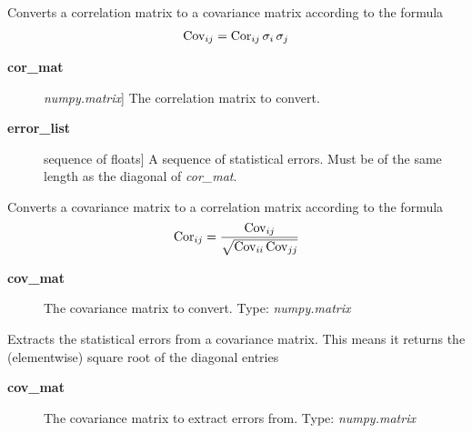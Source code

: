 \documentclass[letterpaper,10pt,english]{sphinxmanual}
\begin{document}
\begin{fulllineitems}
\label{api/kafe:kafe.numeric_tools.cor_to_cov}
Converts a correlation matrix to a covariance matrix according to the formula
\begin{gather}
\begin{split}\text{Cov}_{ij} = \text{Cor}_{ij}\, \sigma_i \, \sigma_j\end{split}\notag
\end{gather}\begin{description}
\item[{\textbf{cor\_mat}}] \leavevmode{[}\emph{numpy.matrix}{]}
The correlation matrix to convert.

\item[{\textbf{error\_list}}] \leavevmode{[}sequence of floats{]}
A sequence of statistical errors. Must be of the same length
as the diagonal of \emph{cor\_mat}.

\end{description}

\end{fulllineitems}


\begin{fulllineitems}
\label{api/kafe:kafe.numeric_tools.cov_to_cor}
Converts a covariance matrix to a correlation matrix according to the formula
\begin{gather}
\begin{split}\text{Cor}_{ij} = \frac{\text{Cov}_{ij}}{\sqrt{ \text{Cov}_{ii}\,\text{Cov}_{jj}}}\end{split}\notag
\end{gather}\begin{description}
\item[{\textbf{cov\_mat}}] \leavevmode
The covariance matrix to convert. Type: \emph{numpy.matrix}

\end{description}

\end{fulllineitems}


\begin{fulllineitems}
\label{api/kafe:kafe.numeric_tools.extract_statistical_errors}
Extracts the statistical errors from a covariance matrix. This means
it returns the (elementwise) square root of the diagonal entries
\begin{description}
\item[{\textbf{cov\_mat}}] \leavevmode
The covariance matrix to extract errors from. Type: \emph{numpy.matrix}

\end{description}

\end{fulllineitems}
\end{document}
